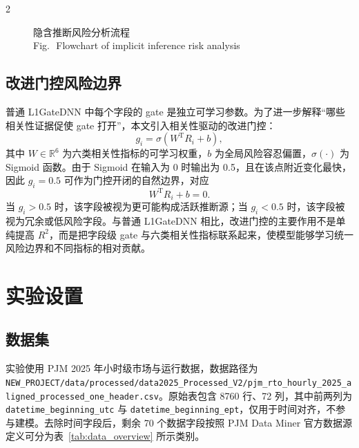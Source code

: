 \documentclass[UTF8,zihao=5,twoside]{ctexart}
\numberwithin{equation}{section}
\newcommand{\figbicaption}[2]{%
  \caption{#1\\[-0.2em]\small Fig.\,\thefigure\ #2}
}
\newcommand{\code}[1]{\texttt{#1}}
\begin{document}
\begin{multicols}{2}
\begin{figure}[H]
\centering
{}
\figbicaption{隐含推断风险分析流程}{Flowchart of implicit inference risk analysis}
\label{fig:method_flow}
\end{figure}

\subsection{改进门控风险边界}
普通 L1GateDNN 中每个字段的 gate 是独立可学习参数。为了进一步解释“哪些相关性证据促使 gate 打开”，本文引入相关性驱动的改进门控：
\begin{equation}
g_i=\sigma(W^{\mathrm{T}}R_i+b),
\end{equation}
其中 $W\in\mathbb{R}^{6}$ 为六类相关性指标的可学习权重，$b$ 为全局风险容忍偏置，$\sigma(\cdot)$ 为 Sigmoid 函数。由于 Sigmoid 在输入为 0 时输出为 0.5，且在该点附近变化最快，因此 $g_i=0.5$ 可作为门控开闭的自然边界，对应
\begin{equation}
W^{\mathrm{T}}R_i+b=0.
\end{equation}
当 $g_i>0.5$ 时，该字段被视为更可能构成活跃推断源；当 $g_i<0.5$ 时，该字段被视为冗余或低风险字段。与普通 L1GateDNN 相比，改进门控的主要作用不是单纯提高 $R^2$，而是把字段级 gate 与六类相关性指标联系起来，使模型能够学习统一风险边界和不同指标的相对贡献。

\section{实验设置}
\subsection{数据集}
实验使用 PJM 2025 年小时级市场与运行数据，数据路径为 \code{NEW\_PROJECT/data/processed/data2025\_Processed\_V2/pjm\_rto\_hourly\_2025\_aligned\_processed\_one\_header.csv}。原始表包含 8760 行、72 列，其中前两列为 \code{datetime\_beginning\_utc} 与 \code{datetime\_beginning\_ept}，仅用于时间对齐，不参与建模。去除时间字段后，剩余 70 个数据字段按照 PJM Data Miner 官方数据源定义可分为表~\ref{tab:data_overview} 所示类别。


\end{multicols}
\end{document}
